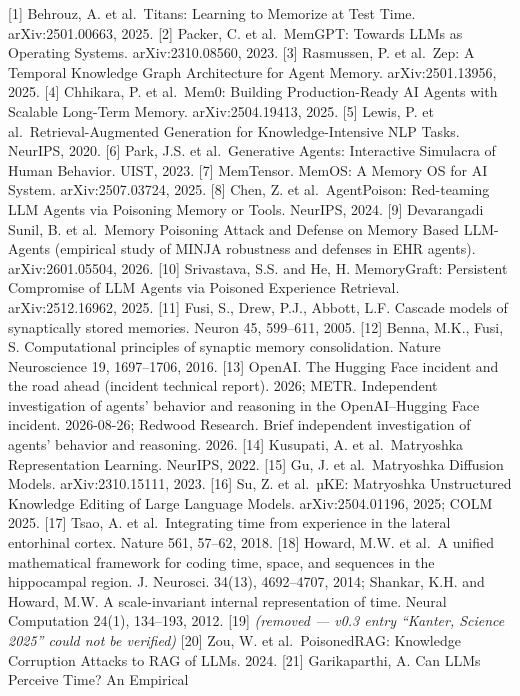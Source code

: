 \documentclass[
]{article}
\begin{document}
{[}1{]} Behrouz, A. et al.~Titans: Learning to Memorize at Test Time.
arXiv:2501.00663, 2025. {[}2{]} Packer, C. et al.~MemGPT: Towards LLMs
as Operating Systems. arXiv:2310.08560, 2023. {[}3{]} Rasmussen, P. et
al.~Zep: A Temporal Knowledge Graph Architecture for Agent Memory.
arXiv:2501.13956, 2025. {[}4{]} Chhikara, P. et al.~Mem0: Building
Production-Ready AI Agents with Scalable Long-Term Memory.
arXiv:2504.19413, 2025. {[}5{]} Lewis, P. et al.~Retrieval-Augmented
Generation for Knowledge-Intensive NLP Tasks. NeurIPS, 2020. {[}6{]}
Park, J.S. et al.~Generative Agents: Interactive Simulacra of Human
Behavior. UIST, 2023. {[}7{]} MemTensor. MemOS: A Memory OS for AI
System. arXiv:2507.03724, 2025. {[}8{]} Chen, Z. et al.~AgentPoison:
Red-teaming LLM Agents via Poisoning Memory or Tools. NeurIPS, 2024.
{[}9{]} Devarangadi Sunil, B. et al.~Memory Poisoning Attack and Defense
on Memory Based LLM-Agents (empirical study of MINJA robustness and
defenses in EHR agents). arXiv:2601.05504, 2026. {[}10{]} Srivastava,
S.S. and He, H. MemoryGraft: Persistent Compromise of LLM Agents via
Poisoned Experience Retrieval. arXiv:2512.16962, 2025. {[}11{]} Fusi,
S., Drew, P.J., Abbott, L.F. Cascade models of synaptically stored
memories. Neuron 45, 599--611, 2005. {[}12{]} Benna, M.K., Fusi, S.
Computational principles of synaptic memory consolidation. Nature
Neuroscience 19, 1697--1706, 2016. {[}13{]} OpenAI. The Hugging Face
incident and the road ahead (incident technical report). 2026; METR.
Independent investigation of agents' behavior and reasoning in the
OpenAI--Hugging Face incident. 2026-08-26; Redwood Research. Brief
independent investigation of agents' behavior and reasoning. 2026.
{[}14{]} Kusupati, A. et al.~Matryoshka Representation Learning.
NeurIPS, 2022. {[}15{]} Gu, J. et al.~Matryoshka Diffusion Models.
arXiv:2310.15111, 2023. {[}16{]} Su, Z. et al.~µKE: Matryoshka
Unstructured Knowledge Editing of Large Language Models.
arXiv:2504.01196, 2025; COLM 2025. {[}17{]} Tsao, A. et al.~Integrating
time from experience in the lateral entorhinal cortex. Nature 561,
57--62, 2018. {[}18{]} Howard, M.W. et al.~A unified mathematical
framework for coding time, space, and sequences in the hippocampal
region. J. Neurosci. 34(13), 4692--4707, 2014; Shankar, K.H. and Howard,
M.W. A scale-invariant internal representation of time. Neural
Computation 24(1), 134--193, 2012. {[}19{]} \emph{(removed --- v0.3
entry ``Kanter, Science 2025'' could not be verified)} {[}20{]} Zou, W.
et al.~PoisonedRAG: Knowledge Corruption Attacks to RAG of LLMs. 2024.
{[}21{]} Garikaparthi, A. Can LLMs Perceive Time? An Empirical
\end{document}
